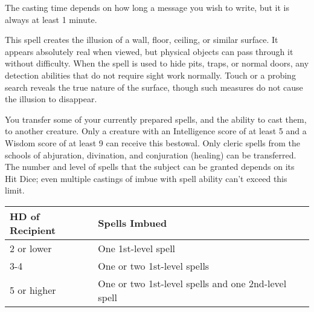 \begin{multicols}{2}
\begin{small}
\smallskip\noindent The casting time depends on how long a message you wish to write, but it is always at least 1 minute.


\noindent This spell creates the illusion of a wall, floor, ceiling, or similar surface. It appears absolutely real when viewed, but physical objects can pass through it without difficulty. When the spell is used to hide pits, traps, or normal doors, any detection abilities that do not require sight work normally. Touch or a probing search reveals the true nature of the surface, though such measures do not cause the illusion to disappear.

\noindent You transfer some of your currently prepared spells, and the ability to cast them, to another creature. Only a creature with an Intelligence score of at least 5 and a Wisdom score of at least 9 can receive this bestowal. Only cleric spells from the schools of abjuration, divination, and conjuration (healing) can be transferred. The number and level of spells that the subject can be granted depends on its Hit Dice; even multiple castings of imbue with spell ability can't exceed this limit.

\begin{center}
\begin{tabular}[h!]{l|p{2in}}
HD of Recipient & Spells Imbued \\ \hline
2 or lower & One 1st-level spell \\
3-4 & One or two 1st-level spells	\\
5 or higher & One or two 1st-level spells and one 2nd-level spell	 \\
\end{tabular}
\end{center}


\end{small}
\end{multicols}

